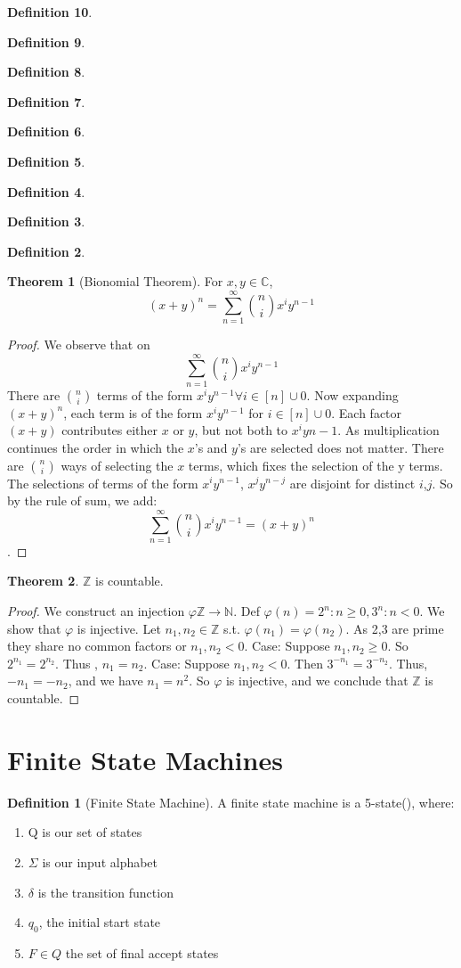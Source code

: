 \documentclass{article}
\theoremstyle{definition}
\newtheorem{define}{Definition}[section]
\newtheorem{thm}{Theorem}[section]
\begin{document}
\begin{define}
\begin{define}
\begin{define}
\begin{define}
\begin{define}
\begin{define}
\begin{define}
\begin{define}
\begin{define}
\begin{thm}[Bionomial Theorem]
For $x,y \in \mathbb{C}$, $$(x+y)^n = {\sum_{n=1}^{\infty}}{{n}\choose{i}}x^{i}y^{n-1}$$
\end{thm}
\begin{proof}
We observe that on $${\sum_{n=1}^{\infty}}{{n}\choose{i}}x^{i}y^{n-1}$$ There are ${n}\choose{i}$
terms of the form $x^{i}y^{n-1} \forall i \in [n]\cup {0}$. Now expanding $(x+y)^n$, each term is of the form $x^{i}y^{n-1}$ for $i \in [n]\cup {0}$. Each factor $(x+y)$ contributes either $x$ or $y$, but not both to $x^{i}y{n-1}$. As multiplication continues the order in which the $x$'s and $y$'s are selected does not matter. There are ${n}\choose{i}$ ways of selecting the $x$ terms, which fixes the selection of the y terms. The selections of terms of the form $x^{i}y^{n-1}$, $x^{j}y^{n-j}$ are disjoint for distinct $i$,$j$. So by the rule of sum, we add: $${\sum_{n=1}^{\infty}}{{n}\choose{i}}x^{i}y^{n-1} = (x+y)^n$$.
\end{proof}

\begin{thm}
$\mathbb{Z}$ is countable.
\end{thm}
\begin{proof}
We construct an injection $\varphi \mathbb{Z} \rightarrow \mathbb{N}$.  Def $\varphi (n) = {2^n: n \geq 0, 3^n: n<0 }$. We show that $\varphi$ is injective. Let $n_1, n_2 \in \mathbb{Z}$ s.t. $\varphi (n_1) = \varphi(n_2)$. As 2,3 are prime they share no common factors or $n_1, n_2 <0$. Case: Suppose $n_1, n_2 \geq 0$. So $2^{n_1}=2^{n_2}$. Thus , $n_1 = n_2$. Case: Suppose $n_1, n_2 <0$. Then $3^{-n_1}=3^{-n_2}$. Thus, $-n_1 = -n_2$, and we have $n_1=n^2$. So $\varphi$ is injective, and we conclude that $\mathbb{Z}$ is countable.
\end{proof}


\section{Finite State Machines}

\begin{define}[Finite State Machine]
A finite state machine is a 5-state(), where:
	\begin{enumerate}
		\item Q is our set of states
		\item $\Sigma$ is our input alphabet
		\item $\delta$ is the transition function
		\item $q_0$, the initial start state
		\item $F \in Q$ the set of final accept states
	\end{enumerate}
\end{define}


\end{define}
\end{define}
\end{define}
\end{define}
\end{define}
\end{define}
\end{define}
\end{define}
\end{define}
\end{document}
